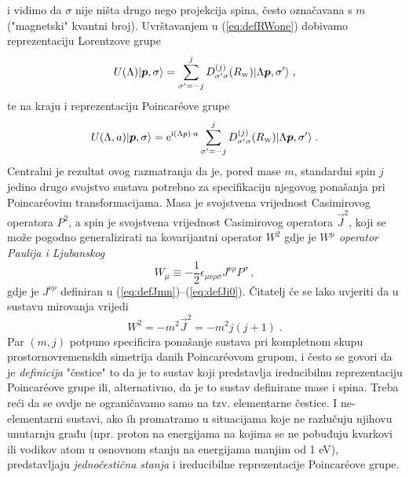 i vidimo da $\sigma$ nije ništa drugo nego projekcija spina, često
označavana s $m$ ("magnetski" kvantni broj).
Uvrštavanjem u (\ref{eq:defRWone}) dobivamo reprezentaciju Lorentzove
grupe 
\begin{equation}
    U(\Lambda) \ket{\vec{p}, \sigma} = 
     \sum_{\sigma'=-j}^{j} D^{(j)}_{\sigma'\sigma}(R_{\scriptscriptstyle\rm W})
     \ket{\Lambda\vec{p}, \sigma'} \;,
\end{equation}
te na kraju i reprezentaciju Poincar\'{e}ove grupe
\begin{equation}
    U(\Lambda, a) \ket{\vec{p}, \sigma} =  \rme^{\rmi (\Lambda p) \cdot a}
     \sum_{\sigma'=-j}^{j} D^{(j)}_{\sigma'\sigma}(R_{\scriptscriptstyle\rm W})
     \ket{\Lambda\vec{p}, \sigma'} \;.
\end{equation}
Centralni je rezultat ovog razmatranja da je, pored mase $m$, standardni spin $j$
jedino drugo svojstvo sustava potrebno za specifikaciju njegovog ponašanja
pri Poincar\'{e}ovim transformacijama.
Masa je svojstvena vrijednost Casimirovog operatora $P^2$, a spin 
je svojstvena vrijednost Casimirovog operatora $\vec{J}^2$, koji se
može pogodno generalizirati na kovarijantni operator $W^2$ gdje je
$W^{\mu}$ \emph{operator Paulija i Ljubanskog} 
\begin{equation}
    W_{\mu} \equiv - \frac{1}{2} \epsilon_{\mu \nu \rho \sigma}
    J^{\nu \rho} P^{\sigma} \,,
    \label{eq:defPLj}
\end{equation}
gdje je $J^{\nu \rho}$ definiran u (\ref{eq:defJmn})--(\ref{eq:defJi0}).
Čitatelj će se lako uvjeriti da u sustavu mirovanja vrijedi
\begin{equation}
    W^2 = - m^2 \vec{J}^2 = -m^2 j (j+1) \;.
\end{equation}
Par $(m, j)$ potpuno specificira ponašanje sustava pri kompletnom skupu
prostornovremenskih simetrija danih Poincar\'{e}ovom grupom, i često se
govori da je \emph{definicija} "čestice" to da je to sustav koji predstavlja
ireducibilnu reprezentaciju Poincar\'{e}ove grupe ili, alternativno,
da je to sustav definirane mase i spina. 
Treba reći da se ovdje ne ograničavamo samo na tzv. elementarne čestice.
I ne-elementarni sustavi, ako ih promatramo u situacijama koje ne razlučuju
njihovu unutarnju građu (npr. proton na energijama na kojima se ne pobuđuju
kvarkovi ili vodikov atom u osnovnom stanju na energijama manjim od 1 eV),
predstavljaju \emph{jednočestična stanja} i ireducibilne reprezentacije
Poincar\'{e}ove grupe.

